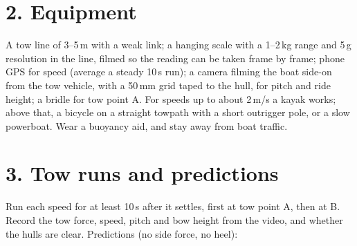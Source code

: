 \documentclass[11pt]{article}
\begin{document}
\section*{2. Equipment}
A tow line of 3--5\,m with a weak link; a hanging scale with a 1--2\,kg range and 5\,g resolution in the line, filmed so the reading can be taken frame by frame; phone GPS for speed (average a steady 10\,s run); a camera filming the boat side-on from the tow vehicle, with a 50\,mm grid taped to the hull, for pitch and ride height; a bridle for tow point A. For speeds up to about 2\,m/s a kayak works; above that, a bicycle on a straight towpath with a short outrigger pole, or a slow powerboat. Wear a buoyancy aid, and stay away from boat traffic.

\section*{3. Tow runs and predictions}
Run each speed for at least 10\,s after it settles, first at tow point A, then at B. Record the tow force, speed, pitch and bow height from the video, and whether the hulls are clear. Predictions (no side force, no heel):

\begin{table}[h]
\centering\small
\caption*{\textbf{Tow point A (sail centre of effort).} Take-off at 1.81\,m/s. Pitch nose up $+$; flap down $+$; bow height relative to the design ride height; elevator depth at its quarter chord.}
\end{table}
\end{document}
